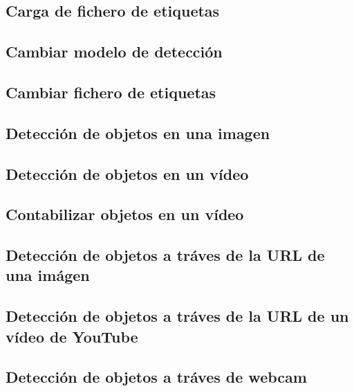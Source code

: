 \subsection{Carga de fichero de etiquetas}
\subsection{Cambiar modelo de detección}
\subsection{Cambiar fichero de etiquetas}
\subsection{Detección de objetos en una imagen}
\subsection{Detección de objetos en un vídeo}
\subsection{Contabilizar objetos en un vídeo}
\subsection{Detección de objetos a tráves de la URL de una imágen}
\subsection{Detección de objetos a tráves de la URL de un vídeo de YouTube}
\subsection{Detección de objetos a tráves de webcam}
